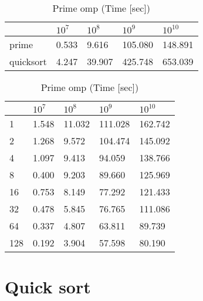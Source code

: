 \documentclass{article}
\begin{document}
\begin{table}[h!]
\begin{minipage}{0.48\textwidth}
\centering
\caption{Sequential execution (Time [sec])}
\label{my-label}
\begin{tabular}{lllll}
&      $10^7$           &    $10^8$    & $10^9$ &  $10^{10}$    \\ \hline
prime          &     0.533           &   9.616  & 105.080  & 148.891  \\ \hline
quicksort      &     4.247          &    39.907 & 425.748  & 653.039 \\
\end{tabular}
\end{minipage}%
\begin{minipage}{0.48\textwidth}
\centering
\caption{Prime omp (Time [sec])}
\label{my-label}
\begin{tabular}{l|llll}
&      $10^7$                             &    $10^8$    & $10^9$    &  $10^{10}$    \\ \hline
1       &       1.548                     &   11.032  & 111.028 & 162.742     \\ \hline
2       &       1.268                     &   9.572   & 104.474 & 145.092     \\ \hline
4       &       1.097                     &   9.413   & 94.059 &  138.766     \\ \hline
8       &       0.400                     &   9.203   & 89.660 &  125.969      \\ \hline
16       &      0.753                     &   8.149   & 77.292 &  121.433      \\ \hline
32       &      0.478                     &   5.845   & 76.765 &  111.086     \\ \hline
64       &      0.337                     &   4.807   & 63.811  & 89.739     \\ \hline
128       & \cellcolor[HTML]{34FF34}    0.192        & \cellcolor[HTML]{34FF34}  3.904   & \cellcolor[HTML]{34FF34} 57.598 & \cellcolor[HTML]{34FF34} 80.190     \\ 
\end{tabular}
\end{minipage}%
\end{table}

\pagebreak

\section{\textbf{Quick sort}}
\end{document}
